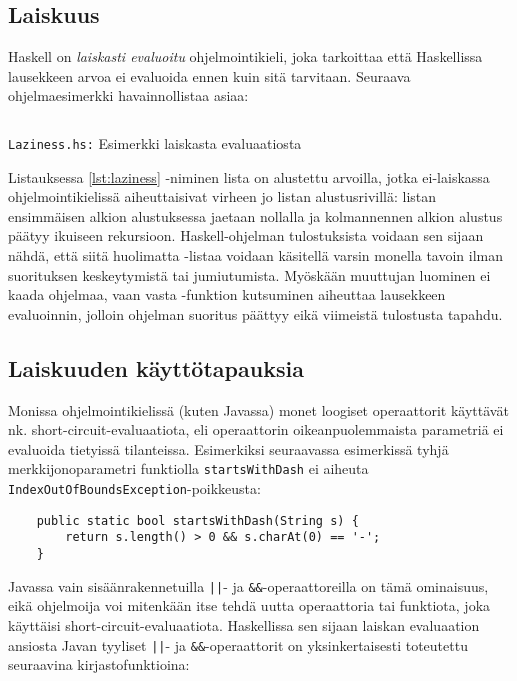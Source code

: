 \subsection{Laiskuus}

Haskell on \emph{laiskasti evaluoitu} ohjelmointikieli,
joka tarkoittaa että Haskellissa lausekkeen arvoa ei evaluoida ennen kuin sitä tarvitaan.
Seuraava ohjelmaesimerkki havainnollistaa asiaa:

\begin{listing}[H]
    \inputminted{haskell}{codes/Laziness.hs}
    \label{lst:laziness}
    \caption{\texttt{Laziness.hs:} Esimerkki laiskasta evaluaatiosta}
\end{listing}

Listauksessa \ref{lst:laziness} -niminen lista on alustettu arvoilla,
jotka ei-laiskassa ohjelmointikielissä aiheuttaisivat virheen jo listan alustusrivillä:
listan ensimmäisen alkion alustuksessa jaetaan nollalla ja kolmannennen alkion
alustus päätyy ikuiseen rekursioon.
Haskell-ohjelman tulostuksista voidaan sen sijaan nähdä,
että siitä huolimatta -listaa voidaan käsitellä varsin monella
tavoin ilman suorituksen keskeytymistä tai jumiutumista.
Myöskään muuttujan  luominen ei kaada ohjelmaa,
vaan vasta -funktion kutsuminen aiheuttaa lausekkeen
 evaluoinnin, jolloin ohjelman suoritus päättyy
eikä viimeistä tulostusta tapahdu.

\subsection{Laiskuuden käyttötapauksia}

Monissa ohjelmointikielissä (kuten Javassa) monet loogiset operaattorit käyttävät nk. short-circuit-evaluaatiota,
eli operaattorin oikeanpuolemmaista parametriä ei evaluoida tietyissä tilanteissa.
Esimerkiksi seuraavassa esimerkissä tyhjä merkkijonoparametri funktiolla \texttt{startsWithDash} ei
aiheuta \texttt{IndexOutOfBoundsException}-poikkeusta:

\begin{verbatim}
    public static bool startsWithDash(String s) {
        return s.length() > 0 && s.charAt(0) == '-';
    }
\end{verbatim}

Javassa vain sisäänrakennetuilla \texttt{||}- ja \texttt{\&\&}-operaattoreilla on tämä ominaisuus,
eikä ohjelmoija voi mitenkään itse tehdä uutta operaattoria tai funktiota,
joka käyttäisi short-circuit-evaluaatiota.
Haskellissa sen sijaan laiskan evaluaation ansiosta Javan tyyliset \texttt{||}- ja \texttt{\&\&}-operaattorit on
yksinkertaisesti toteutettu seuraavina kirjastofunktioina:

